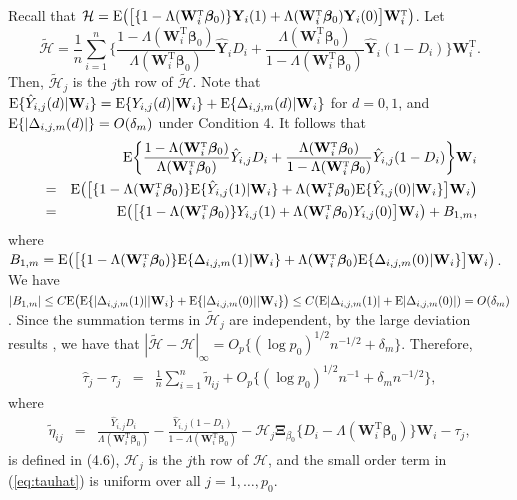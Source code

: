 \documentclass[12pt]{article}
\numberwithin{equation}{section}
\def\bea{\begin{eqnarray}}
\def\eea{\end{eqnarray}}
\def\nn{\nonumber}
\def\T{{ \mathrm{\scriptscriptstyle T} }}
\newcommand{\E}{\rm E}
\newcommand{\bW}{{\mathbf W}}
\newcommand{\bY}{{\mathbf Y}}
\newcommand{\bbeta}  {\boldsymbol{\beta}}
\newcommand{\bXi}{\boldsymbol{\Xi}}
\begin{document}
Recall that $\mathcal{H} = {\E}\big( \big[ \{1 - \Lambda(\bW_{i}^{\T}\bbeta_{0})\} \bY_{i}(1) + \Lambda(\bW_{i}^{\T}\bbeta_{0})\bY_{i}(0) \big] \bW_{i}^{\T} \big)$. 
Let 
$$\tilde{\mathcal{H}} = 
\frac{1}{n}\sum_{i = 1}^{n}\bigg\{\frac{1 - \Lambda(\bW_{i}^{\T}\bbeta_{0})}{\Lambda(\bW_{i}^{\T}\bbeta_{0})} \hat{\bY}_{i}D_{i} + \frac{\Lambda(\bW_{i}^{\T} \bbeta_{0})}{1 - \Lambda(\bW_{i}^{\T} \bbeta_{0})} \hat{\bY}_{i}(1 - D_{i}) \bigg\} \bW_{i}^{\T}.$$
Then, $\tilde{\mathcal{H}}_{j}$ is the $j$th row of $\tilde{\mathcal{H}}$. 
Note that ${\E}\{\hat{Y}_{i, j}(d)|\bW_i\} = {\E}\{Y_{i, j}(d)|\bW_i\} + {\E}\{\Delta_{i, j, m}(d)|\bW_i\}$ for $d = 0, 1$, and ${\E}\{|\Delta_{i, j, m}(d)|\} = O(\delta_m)$ under Condition 4.
It follows that
\bea
&&{\E}\bigg\{\frac{1 - \Lambda(\bW_{i}^{\T}\bbeta_{0})}{\Lambda(\bW_{i}^{\T}\bbeta_{0})} \hat{Y}_{i, j}D_{i} + \frac{\Lambda(\bW_{i}^{\T} \bbeta_{0})}{1 - \Lambda(\bW_{i}^{\T} \bbeta_{0})} \hat{Y}_{i, j}(1 - D_{i}) \bigg\} \bW_{i} \nn \\
&=& 
{\E}\big( \big[ \{1 - \Lambda(\bW_{i}^{\T}\bbeta_{0})\}{\E}\{\hat{Y}_{i,j}(1) | \bW_i\} + \Lambda(\bW_{i}^{\T} \bbeta_{0}) {\E}\{\hat{Y}_{i,j}(0) | \bW_i\} \big] \bW_{i} \big) \nn \\
&=&
{\E}\big( \big[ \{1 - \Lambda(\bW_{i}^{\T}\bbeta_{0})\}Y_{i,j}(1) + \Lambda(\bW_{i}^{\T} \bbeta_{0}) Y_{i,j}(0) \big] \bW_{i} \big) + B_{1, m}, \nn
\eea
where $B_{1, m} = {\E}\big( \big[ \{1 - \Lambda(\bW_{i}^{\T}\bbeta_{0})\}{\E}\{\Delta_{i,j,m}(1) | \bW_i\} + \Lambda(\bW_{i}^{\T} \bbeta_{0}) {\E}\{\Delta_{i,j,m}(0) | \bW_i\} \big] \bW_{i} \big)$.
We have $|B_{1, m}| \leq C {\E}\big( {\E}\{|\Delta_{i,j,m}(1)| | \bW_i\} + {\E}\{|\Delta_{i,j,m}(0)| | \bW_i\} \big) \leq C({\E}|\Delta_{i,j,m}(1)| + {\E}|\Delta_{i,j,m}(0)|) = O(\delta_m)$.
Since the summation terms in $\tilde{\mathcal{H}}_{j}$ are independent, 
by the large deviation results \citep{petrov2012sums}, we have that $|\tilde{\mathcal{H}} - \mathcal{H}|_{\infty} = O_p\{(\log p_0)^{1/2}n^{-1/2} + \delta_m\}$. Therefore, 
\bea
\hat{\tau}_{j} - \tau_{j}
&=& 
\frac{1}{n}\sum_{i = 1}^{n} \tilde{\eta}_{ij}
+ 
O_{p}\{(\log p_0)^{1/2}n^{-1} + \delta_m n^{-1/2}\},\label{eq:tauhat}
\eea
where 
\bea
\tilde{\eta}_{ij} &=& \frac{\hat{Y}_{i, j}D_{i}}{\Lambda(\bW_{i}^{\T}\bbeta_{0})} - \frac{\hat{Y}_{i, j}(1 - D_{i})}{1 - \Lambda(\bW_{i}^{\T}\bbeta_{0})} - \mathcal{H}_{j} \bXi_{\beta_{0}} \{D_{i} - \Lambda(\bW_{i}^{\T}\bbeta_{0})\} \bW_{i} - \tau_j, 
\nn\eea
is defined in (4.6), $\mathcal{H}_{j}$ is the $j$th row of $\mathcal{H}$, and the small order term 
in (\ref{eq:tauhat})
is uniform over all $j = 1, \ldots, p_0$. 
\end{document}
